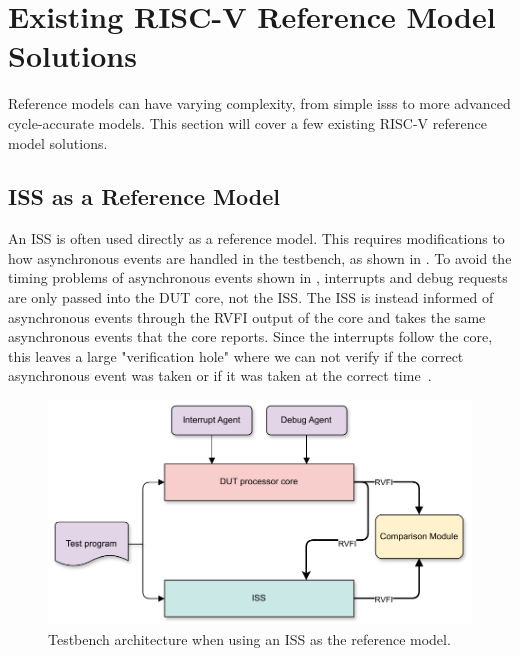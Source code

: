 \section{Existing RISC-V Reference Model Solutions}
\label{sec:bg_existingReference}

Reference models can have varying complexity, from simple  \acrshort{iss}s to more advanced cycle-accurate models. This section will cover a few existing RISC-V reference model solutions.

\subsection{ISS as a Reference Model}
\label{sec:bg_iss_refmod}

An ISS is often used directly as a reference model. This requires modifications to how asynchronous events are handled in the testbench, as shown in . To avoid the timing problems of asynchronous events shown in , interrupts and debug requests are only passed into the DUT core, not the ISS. The ISS is instead informed of asynchronous events through the RVFI output of the core and takes the same asynchronous events that the core reports. Since the interrupts follow the core, this leaves a large "verification hole" where we can not verify if the correct asynchronous event was taken or if it was taken at the correct time~\cite{taylorAdvancedRISCVVerification2023}. 

\begin{figure}
    \centering
    \includegraphics[width=0.75\linewidth]{figures/ISS_architecture.pdf}
    \caption{Testbench architecture when using an ISS as the reference model.}
    \label{fig:iss_testbench}
\end{figure}
%

